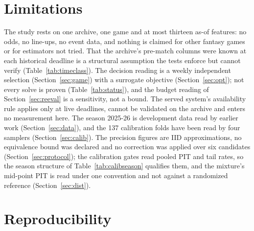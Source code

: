 \documentclass[11pt,a4paper]{article}
\begin{document}
\section{Limitations}
\label{sec:limitations}

The study rests on one archive, one game and at most thirteen as-of features: no odds, no line-ups, no event data, and nothing is claimed for other fantasy games or for estimators not tried. That the archive's pre-match columns were known at each historical deadline is a structural assumption the tests enforce but cannot verify (Table~\ref{tab:timeclass}). The decision reading is a weekly independent selection (Section~\ref{sec:game}) with a surrogate objective (Section~\ref{sec:opt}); not every solve is proven (Table~\ref{tab:status}), and the budget reading of Section~\ref{sec:reeval} is a sensitivity, not a bound. The served system's availability rule applies only at live deadlines, cannot be validated on the archive and enters no measurement here. The season 2025-26 is development data read by earlier work (Section~\ref{sec:data}), and the 137 calibration folds have been read by four samplers (Section~\ref{sec:calib}). The precision figures are IID approximations, no equivalence bound was declared and no correction was applied over six candidates (Section~\ref{sec:protocol}); the calibration gates read pooled PIT and tail rates, so the season structure of Table~\ref{tab:calibseason} qualifies them, and the mixture's mid-point PIT is read under one convention and not against a randomized reference (Section~\ref{sec:dist}).

\section{Reproducibility}
\label{sec:repro}
\end{document}
